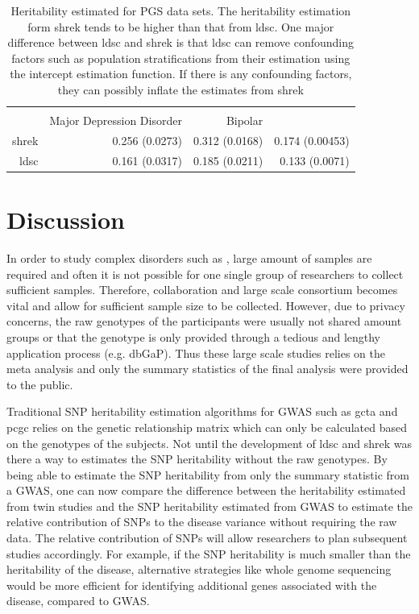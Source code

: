 \documentclass[12pt]{scrbook}
\newcommand*{\glng}{\glsentrylong}
\newcommand*{\Glng}{\Glsentrylong}
\begin{document}
\begin{table}
	\centering
	\begin{tabular}{rrrr}
		\toprule
		\\
		& Major Depression Disorder & Bipolar & \Glng{scz}\\
		\midrule
		\gls{shrek}   & 0.256 (0.0273)  & 0.312 (0.0168)  & 0.174 (0.00453) \\
		\gls{ldsc}   & 0.161 (0.0317) & 0.185 (0.0211) & 0.133 (0.0071)\\
		\bottomrule
	\end{tabular}
	\caption[Heritability Estimated for PGC Data Sets]{
		Heritability estimated for \gls{PGS} data sets.
		The heritability estimation form \gls{shrek} tends to be higher than that from \gls{ldsc}.
		One major difference between \gls{ldsc} and \gls{shrek} is that \gls{ldsc} can remove confounding factors such as population stratifications from their estimation using the intercept estimation function. 
		If there is any confounding factors, they can possibly inflate the estimates from \gls{shrek}
	}
	\label{tab:realData}
\end{table}

\section{Discussion}
In order to study complex disorders such as \glng{scz}, large amount of samples are required and often it is not possible for one single group of researchers to collect sufficient samples.
Therefore, collaboration and large scale consortium becomes vital and allow for sufficient sample size to be collected.
However, due to privacy concerns, the raw genotypes of the participants were usually not shared amount groups or that the genotype is only provided through a tedious and lengthy application process (e.g. dbGaP).
Thus these large scale studies relies on the meta analysis and only the summary statistics of the final analysis were provided to the public.

Traditional \gls{SNP} heritability estimation algorithms for \gls{GWAS} such as \gls{gcta} and \gls{pcgc} relies on the genetic relationship matrix which can only be calculated based on the genotypes of the subjects.
Not until the development of \gls{ldsc} and \gls{shrek} was there a way to estimates the \gls{SNP} heritability without the raw genotypes.
By being able to estimate the \gls{SNP} heritability from only the summary statistic from a \gls{GWAS}, one can now compare the difference between the heritability estimated from twin studies and the \gls{SNP} heritability estimated from \gls{GWAS} to estimate the relative contribution of \glspl{SNP} to the disease variance without requiring the raw data.
The relative contribution of \glspl{SNP} will allow researchers to plan subsequent studies accordingly.
For example, if the \gls{SNP} heritability is much smaller than the heritability of the disease, alternative strategies like whole genome sequencing would be more efficient for identifying additional genes associated with the disease, compared to \gls{GWAS}.
\end{document}
